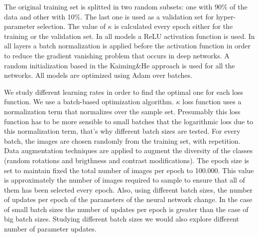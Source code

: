 \documentclass{IOS-Book-Article}
\begin{document}
The original training set is splitted in two random subsets: one with 90\% of the data and other with 10\%. The last one is used as a validation set for hyper-parameter selection. The value of $\kappa$ is calculated every epoch either for the training or the validation set. In all models a ReLU\cite{Dahl2013} activation function is used. In all layers a batch normalization \cite{batch-norm} is applied before the activation function in order to reduce the gradient vanishing problem that occurs in deep networks. A random initialization based in the Kaiming\&He approach\cite{kaiming} is used for all the networks. All models are optimized using Adam over batches. 

We study different learning rates in order to find the optimal one for each loss function. We use a batch-based optimization algorithm. $\kappa$ loss function uses a normalization term that normalizes over the sample set. Presumably this loss function has to be more sensible to small batches that the logarithmic loss due to this normalization term, that's why different batch sizes are tested. For every batch, the images are chosen randomly from the training set, with repetition. Data augmentation techniques are applied to augment the diversity of the classes (random rotations and brigthness and contrast modifications). The epoch size is set to maintain fixed the total number of images per epoch to 100.000. This value is approximately the number of images required to sample to ensure that all of them has been selected every epoch. Also, using different batch sizes, the number of updates per epoch of the parameters of the neural network change. In the case of small batch sizes the number of updates per epoch is greater than the case of big batch sizes. Studying different batch sizes we would also explore different number of parameter updates.
\end{document}
